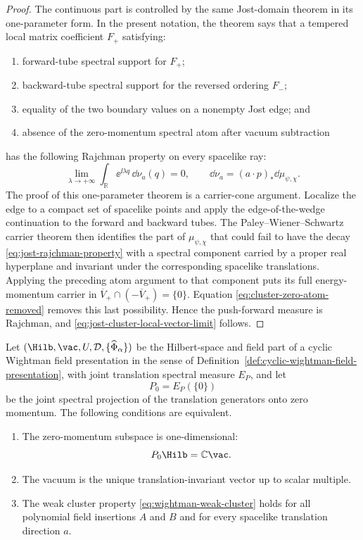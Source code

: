 \begin{proof}
The continuous part is controlled by the same Jost-domain theorem in its
one-parameter form.  In the present notation, the theorem says that a
tempered local matrix coefficient \(F_+\) satisfying:
\begin{enumerate}[label=\textup{(\alph*)}]
\item forward-tube spectral support for \(F_+\);
\item backward-tube spectral support for the reversed ordering \(F_-\);
\item equality of the two boundary values on a nonempty Jost edge; and
\item absence of the zero-momentum spectral atom after vacuum subtraction
\end{enumerate}
has the following Rajchman property on every spacelike ray:
\begin{equation}
  \lim_{\lambda\to+\infty}
  \int_{\mathbb R} \ee^{\ii\lambda q}\,\dd\nu_a(q)=0,
  \qquad
  \dd\nu_a=(a\cdot p)_*\dd\mu_{\psi,\chi}.
  \label{eq:jost-rajchman-property}
\end{equation}
The proof of this one-parameter theorem is a carrier-cone argument.  Localize
the edge to a compact set of spacelike points and apply the
edge-of-the-wedge continuation to the forward and backward tubes.  The
Paley--Wiener--Schwartz carrier theorem then identifies the part of
\(\mu_{\psi,\chi}\) that could fail to have the decay
\eqref{eq:jost-rajchman-property} with a spectral component carried by a
proper real hyperplane and invariant under the corresponding spacelike
translations.  Applying the preceding atom argument to that component puts
its full energy-momentum carrier in
\(\overline V_+\cap(-\overline V_+)=\{0\}\).  Equation
\eqref{eq:cluster-zero-atom-removed} removes this last possibility.  Hence
the push-forward measure is Rajchman, and
\eqref{eq:jost-cluster-local-vector-limit} follows.
\end{proof}

\begin{theorem}
\label{thm:wightman-cluster-vacuum-uniqueness}
Let
\((\Hilb,\vac,U,\mathcal D,\{\widehat\Phi_\alpha\})\)
be the Hilbert-space and field part of a cyclic Wightman field presentation in
the sense of Definition~\ref{def:cyclic-wightman-field-presentation}, with
joint translation spectral measure \(E_P\), and let
\[
  P_0=E_P(\{0\})
\]
be the joint spectral projection of the translation generators onto zero
momentum.  The following conditions are equivalent.
\begin{enumerate}[label=\textup{(\roman*)}]
\item The zero-momentum subspace is one-dimensional:
\[
  P_0\Hilb=\mathbb C\vac .
\]
\item The vacuum is the unique translation-invariant vector up to scalar
multiple.
\item The weak cluster property \eqref{eq:wightman-weak-cluster} holds for
all polynomial field insertions \(A\) and \(B\) and for every spacelike
translation direction \(a\).
\end{enumerate}
\end{theorem}

